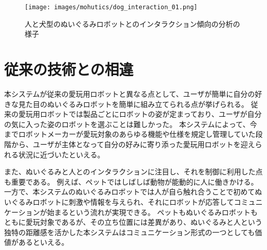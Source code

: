 \documentclass[uplatex,a4paper,12pt]{jsarticle}
\begin{document}

\begin{figure}[htbp]
  \centering
  \texttt{[image: images/mohutics/dog\_interaction\_01.png]}
  \caption{人と犬型のぬいぐるみロボットとのインタラクション傾向の分析の様子}
  \label{fig:mohutics:interaction}
\end{figure}


\section{従来の技術との相違}
本システムが従来の愛玩用ロボットと異なる点として、ユーザが簡単に自分の好きな見た目のぬいぐるみロボットを簡単に組み立てられる点が挙げられる。
従来の愛玩用ロボットでは製品ごとにロボットの姿が定まっており、ユーザが自分の気に入った姿のロボットを選ぶことは難しかった。
本システムによって、今までロボットメーカーが愛玩対象のあらゆる機能や仕様を規定し管理していた段階から、ユーザが主体となって自分の好みに寄り添った愛玩用ロボットを迎えられる状況に近づいたといえる。

また、ぬいぐるみと人とのインタラクションに注目し、それを制御に利用した点も重要である。
例えば、ペットではしばしば動物が能動的に人に働きかける。
一方で、本システムのぬいぐるみロボットでは人が自ら触れ合うことで初めてぬいぐるみロボットに刺激や情報を与えられ、それにロボットが応答してコミュニケーションが始まるという流れが実現できる。
ペットもぬいぐるみロボットもともに愛玩対象であるが、その立ち位置には差異があり、ぬいぐるみと人という独特の距離感を活かした本システムはコミュニケーション形式の一つとしても価値があるといえる。
\end{document}
